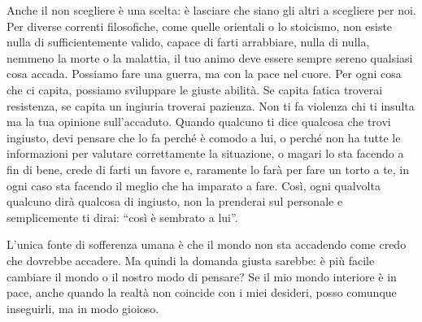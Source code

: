 \documentclass[12pt]{book} %
\begin{document}
Anche il non scegliere è una scelta: è lasciare che siano gli altri a scegliere per noi. Per diverse correnti filosofiche, come quelle orientali o
lo stoicismo, non esiste nulla di sufficientemente valido, capace di farti arrabbiare, nulla di nulla, nemmeno la morte
o la malattia, il tuo animo deve essere sempre sereno qualsiasi cosa accada. Possiamo fare una guerra, ma con la pace nel cuore. Per ogni cosa che ci capita, possiamo sviluppare le giuste abilità. Se capita fatica troverai resistenza, se
capita un ingiuria troverai pazienza. Non ti fa violenza chi ti insulta ma la tua opinione
sull'accaduto. Quando qualcuno ti dice qualcosa che trovi ingiusto, devi pensare che lo fa perché
è comodo a lui, o perché non ha tutte le informazioni per valutare correttamente la situazione, o magari lo sta facendo a fin di bene, crede di farti un favore e, raramente lo farà per fare un torto a te, in ogni caso sta facendo il meglio che ha imparato a fare. 
Così, ogni qualvolta qualcuno dirà qualcosa di ingiusto, non la prenderai sul personale e semplicemente ti dirai: “così è sembrato a lui”.

L'unica fonte di sofferenza umana è che il mondo non sta accadendo come credo che dovrebbe accadere. Ma quindi la domanda giusta sarebbe: è più facile cambiare il mondo o il nostro modo di pensare? Se il mio mondo interiore è in pace, anche quando la realtà non coincide con i miei desideri, posso comunque inseguirli, ma in modo gioioso.
\end{document}
